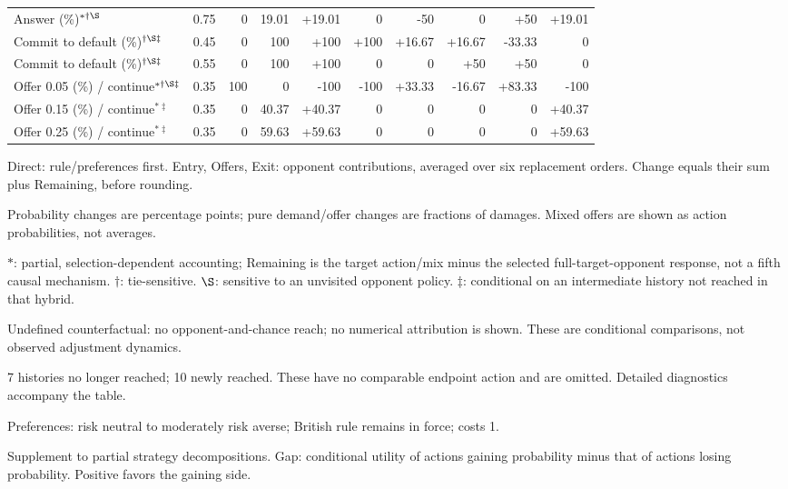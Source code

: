 \documentclass[10pt]{article}
\begin{document}
{\begin{longtable}{@{}>{\raggedright\arraybackslash}p{1.65in}rrrrrrrrr@{}}
Answer (\%)$^{*\dagger\S}$ & 0.75 & 0 & 19.01 & +19.01 & 0 & -50 & 0 & +50 & +19.01\\
Commit to default (\%)$^{\dagger\S\ddagger}$ & 0.45 & 0 & 100 & +100 & +100 & +16.67 & +16.67 & -33.33 & 0\\
Commit to default (\%)$^{\dagger\S\ddagger}$ & 0.55 & 0 & 100 & +100 & 0 & 0 & +50 & +50 & 0\\
Offer 0.05 (\%) / continue$^{*\dagger\S\ddagger}$ & 0.35 & 100 & 0 & -100 & -100 & +33.33 & -16.67 & +83.33 & -100\\
Offer 0.15 (\%) / continue$^{*\ddagger}$ & 0.35 & 0 & 40.37 & +40.37 & 0 & 0 & 0 & 0 & +40.37\\
Offer 0.25 (\%) / continue$^{*\ddagger}$ & 0.35 & 0 & 59.63 & +59.63 & 0 & 0 & 0 & 0 & +59.63\\
\end{longtable}}
{\footnotesize Direct: rule/preferences first. Entry, Offers, Exit: opponent contributions, averaged over six replacement orders. Change equals their sum plus Remaining, before rounding.\par
Probability changes are percentage points; pure demand/offer changes are fractions of damages. Mixed offers are shown as action probabilities, not averages.\par
$*$: partial, selection-dependent accounting; Remaining is the target action/mix minus the selected full-target-opponent response, not a fifth causal mechanism. $\dagger$: tie-sensitive. $\S$: sensitive to an unvisited opponent policy. $\ddagger$: conditional on an intermediate history not reached in that hybrid.\par
Undefined counterfactual: no opponent-and-chance reach; no numerical attribution is shown. These are conditional comparisons, not observed adjustment dynamics.\par
7 histories no longer reached; 10 newly reached. These have no comparable endpoint action and are omitted. Detailed diagnostics accompany the table.}\par
{}\par
Preferences: risk neutral to moderately risk averse; British rule remains in force; costs 1.\par
{\small Supplement to partial strategy decompositions. Gap: conditional utility of actions gaining probability minus that of actions losing probability. Positive favors the gaining side.}\par
\end{document}
